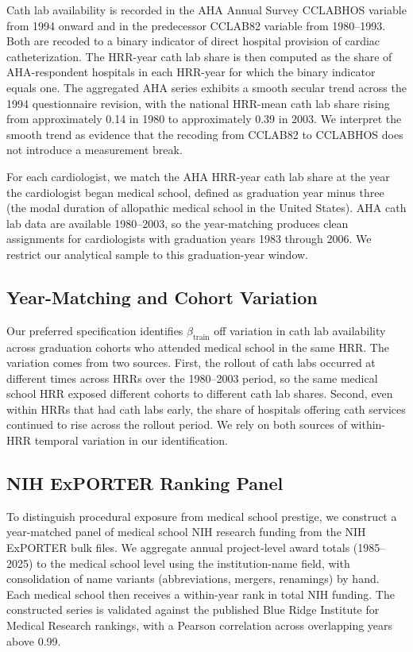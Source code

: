 \documentclass[12pt]{article}
\begin{document}
Cath lab availability is recorded in the AHA Annual Survey CCLABHOS variable from 1994 onward and in the predecessor CCLAB82 variable from 1980--1993. Both are recoded to a binary indicator of direct hospital provision of cardiac catheterization. The HRR-year cath lab share is then computed as the share of AHA-respondent hospitals in each HRR-year for which the binary indicator equals one. The aggregated AHA series exhibits a smooth secular trend across the 1994 questionnaire revision, with the national HRR-mean cath lab share rising from approximately 0.14 in 1980 to approximately 0.39 in 2003. We interpret the smooth trend as evidence that the recoding from CCLAB82 to CCLABHOS does not introduce a measurement break.

For each cardiologist, we match the AHA HRR-year cath lab share at the year the cardiologist began medical school, defined as graduation year minus three (the modal duration of allopathic medical school in the United States). AHA cath lab data are available 1980--2003, so the year-matching produces clean assignments for cardiologists with graduation years 1983 through 2006. We restrict our analytical sample to this graduation-year window.

\subsection{Year-Matching and Cohort Variation}

Our preferred specification identifies $\beta_{\text{train}}$ off variation in cath lab availability across graduation cohorts who attended medical school in the same HRR. The variation comes from two sources. First, the rollout of cath labs occurred at different times across HRRs over the 1980--2003 period, so the same medical school HRR exposed different cohorts to different cath lab shares. Second, even within HRRs that had cath labs early, the share of hospitals offering cath services continued to rise across the rollout period. We rely on both sources of within-HRR temporal variation in our identification.

\subsection{NIH ExPORTER Ranking Panel}

To distinguish procedural exposure from medical school prestige, we construct a year-matched panel of medical school NIH research funding from the NIH ExPORTER bulk files. We aggregate annual project-level award totals (1985--2025) to the medical school level using the institution-name field, with consolidation of name variants (abbreviations, mergers, renamings) by hand. Each medical school then receives a within-year rank in total NIH funding. The constructed series is validated against the published Blue Ridge Institute for Medical Research rankings, with a Pearson correlation across overlapping years above 0.99.
\end{document}
